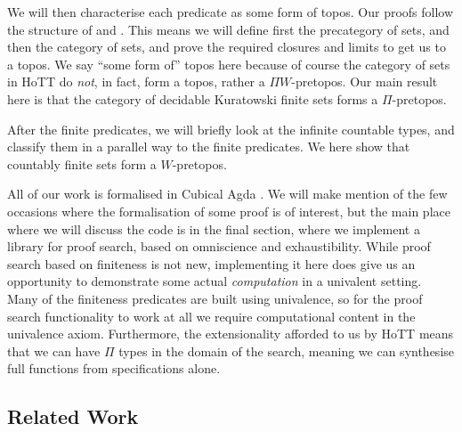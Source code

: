We will then characterise each predicate as some form of topos.
Our proofs follow the structure of \cite[Chapters 9, 10]{hottbook} and
\cite{rijkeSetsHomotopyType2015}.
This means we will define first the precategory of sets, and then the category
of sets, and prove the required closures and limits to get us to a topos.
We say ``some form of'' topos here because of course the category of sets in
HoTT do \emph{not}, in fact, form a topos, rather a \(\Pi W\)-pretopos.
Our main result here is that the category of decidable Kuratowski finite sets
forms a \(\Pi\)-pretopos.

After the finite predicates, we will briefly look at the infinite countable
types, and classify them in a parallel way to the finite predicates.
We here show that countably finite sets form a \(W\)-pretopos.

All of our work is formalised in Cubical Agda
\cite{vezzosiCubicalAgdaDependently2019}.
We will make mention of the few occasions where the formalisation of some proof
is of interest, but the main place where we will discuss the code is in the
final section, where we implement a library for proof search, based on
omniscience and exhaustibility.
While proof search based on finiteness is not new, implementing it here does
give us an opportunity to demonstrate some actual \emph{computation} in a
univalent setting.
Many of the finiteness predicates are built using univalence, so for the proof
search functionality to work at all we require computational content in the
univalence axiom.
Furthermore, the extensionality afforded to us by HoTT means that we can have
\(\Pi\) types in the domain of the search, meaning we can synthesise full
functions from specifications alone.
\subsection{Related Work}
